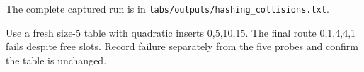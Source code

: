 The complete captured run is in \texttt{labs/outputs/hashing\_collisions.txt}.

\begin{tryit}

Use a fresh size-5 table with quadratic inserts 0,5,10,15. The final route 0,1,4,4,1 fails despite free slots. Record failure separately from the five probes and confirm the table is unchanged.

\end{tryit}
